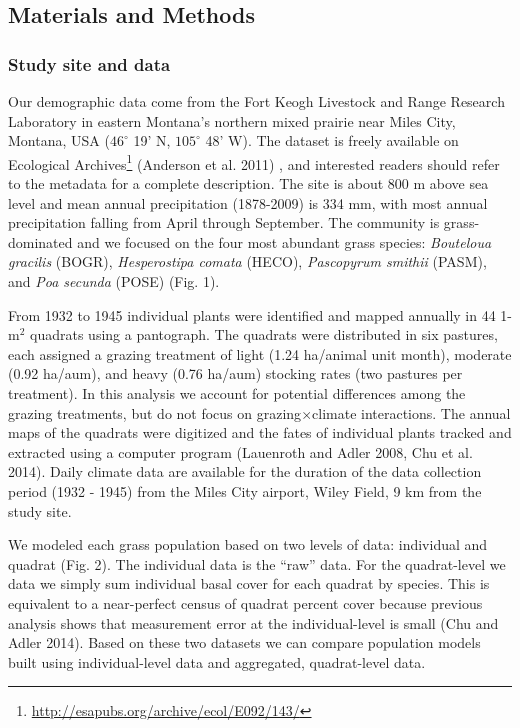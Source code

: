 \documentclass[12pt,]{article}
\let\rmarkdownfootnote\footnote%
\def\footnote{\protect\rmarkdownfootnote}
\begin{document}
\subsection{Materials and Methods}\label{materials-and-methods}

\subsubsection{Study site and data}\label{study-site-and-data}

Our demographic data come from the Fort Keogh Livestock and Range
Research Laboratory in eastern Montana's northern mixed prairie near
Miles City, Montana, USA (\(46^{\circ}\) 19' N, \(105^{\circ}\) 48' W).
The dataset is freely available on Ecological Archives\footnote{\url{http://esapubs.org/archive/ecol/E092/143/}}
(Anderson et al. 2011) , and interested readers should refer to the
metadata for a complete description. The site is about 800 m above sea
level and mean annual precipitation (1878-2009) is 334 mm, with most
annual precipitation falling from April through September. The community
is grass-dominated and we focused on the four most abundant grass
species: \emph{Bouteloua gracilis} (BOGR), \emph{Hesperostipa comata}
(HECO), \emph{Pascopyrum smithii} (PASM), and \emph{Poa secunda} (POSE)
(Fig. 1).

From 1932 to 1945 individual plants were identified and mapped annually
in 44 1-\(\text{m}^2\) quadrats using a pantograph. The quadrats were
distributed in six pastures, each assigned a grazing treatment of light
(1.24 ha/animal unit month), moderate (0.92 ha/aum), and heavy (0.76
ha/aum) stocking rates (two pastures per treatment). In this analysis we
account for potential differences among the grazing treatments, but do
not focus on grazing\(\times\)climate interactions. The annual maps of
the quadrats were digitized and the fates of individual plants tracked
and extracted using a computer program (Lauenroth and Adler 2008, Chu et
al. 2014). Daily climate data are available for the duration of the data
collection period (1932 - 1945) from the Miles City airport, Wiley
Field, 9 km from the study site.

We modeled each grass population based on two levels of data: individual
and quadrat (Fig. 2). The individual data is the ``raw'' data. For the
quadrat-level we data we simply sum individual basal cover for each
quadrat by species. This is equivalent to a near-perfect census of
quadrat percent cover because previous analysis shows that measurement
error at the individual-level is small (Chu and Adler 2014). Based on
these two datasets we can compare population models built using
individual-level data and aggregated, quadrat-level data.
\end{document}
